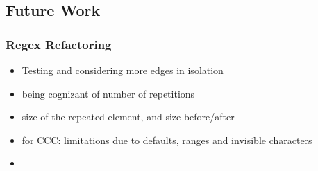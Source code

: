\subsection{Future Work}


\begin{frame} %
\frametitle{Regex Refactoring}
\begin{itemize}
\item Testing and considering more edges in isolation
\item being cognizant of number of repetitions
\item size of the repeated element, and size before/after
\item for CCC: limitations due to defaults, ranges and invisible characters
\item
\end{itemize}
\end{frame}

